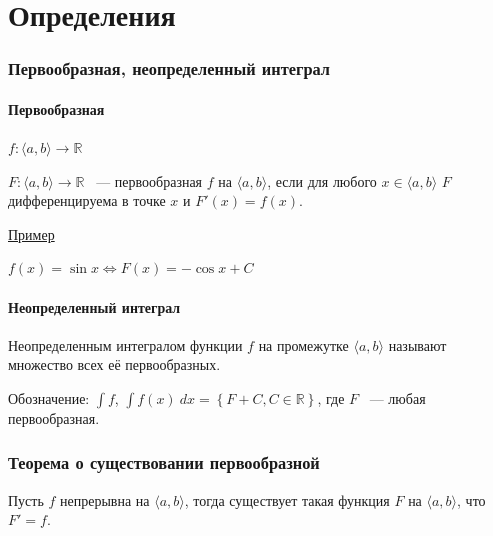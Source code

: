 \documentclass{article}
\begin{document}
\newcommand{\PG}[0]{\Pi\Gamma}
\newcommand{\Segm}[0]{\mathrm{Segm} $\ $}
\newcommand{\diam}[0]{\mathrm{diam} $\ $}
\newcommand{\Int}[0]{\mathrm{Int} $\ $}
\newcommand{\grad}[0]{\mathrm{grad} $\ $}

\tableofcontents

\newpage 

\part{Определения}

	\newpage
	
	\section{Первообразная, неопределенный интеграл}
	
		\subsection{Первообразная}
	
			$f: \langle a, b \rangle \rightarrow \mathbb{R}$
	
			$F: \langle a, b \rangle \rightarrow \mathbb{R}$ ~--- первообразная $f$ на $\langle a, b \rangle$, если для любого $x \in \langle a, b \rangle$ $F$ дифференцируема в точке $x$ и $F'(x) = f(x)$.
	
			\underline{Пример}
	
			$f(x) = \sin{x} \Longleftrightarrow F(x) = -\cos{x} + C$
	
		\subsection{Неопределенный интеграл}
	
			Неопределенным интегралом функции $f$ на промежутке $\langle a, b \rangle$ называют множество всех её первообразных.
			
			Обозначение: $\int{f}$, $\int{f(x)~dx} = \left\{ F + C, C \in \mathbb{R} \right\}$, где $F$ ~--- любая первообразная.
		
	\newpage
		
	\section{Теорема о существовании первообразной}
		
		Пусть $f$ непрерывна на $\langle a, b \rangle$, тогда существует такая функция $F$ на $\langle a, b \rangle$, что $F' = f$.
			
\end{document}

